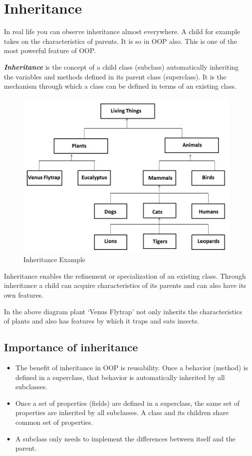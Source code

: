 \documentclass[11pt,a4paper]{article}
\author{TalentSprint}
\date{}
\begin{document}
\section*{Inheritance}
 In real life you can observe inheritance almost everywhere. A child for example takes on the characteristics of parents. It is so in OOP also.
 This is one of the most powerful feature of OOP.
 
\emph{\textbf{Inheritance}} is the concept of a child class (subclass) automatically inheriting the variables and methods defined in its parent class (superclass). It is the mechanism through which a class can be defined in terms of an existing class.
 
 \begin{figure}[H] 
 \begin{center}
   \includegraphics[scale=.35]{Inheritance.png}
   \caption{Inheritance Example}
 \end{center}
 \end{figure}
 
Inheritance enables the refinement or specialization of an existing class. Through inheritance a child can acquire characteristics of its parents and can also have its own features.
 
 In the above diagram plant `Venus Flytrap' not only inherits the characteristics of plants and also has features by which it traps and eats insects.

 \subsection*{Importance of inheritance}
 \begin{itemize}
  \item The benefit of inheritance in OOP is reusability. Once a behavior (method) is defined in a superclass, that behavior is automatically inherited by all subclasses.
  \item Once a set of properties (fields) are defined in a superclass, the same set of properties are inherited by all subclasses. A class and its children share common set of properties.
  \item A subclass only needs to implement the differences between itself and the parent.

 \end{itemize}
\end{document}
